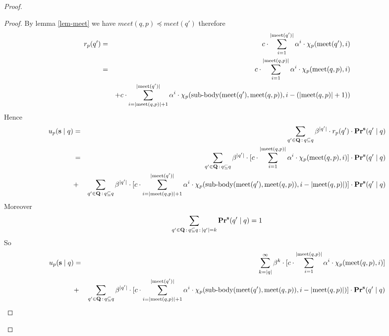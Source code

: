 \begin{proof}
\begin{proof}
	By lemma \ref{lem-meet} we have $meet(q,p) \preceq meet(q')$ therefore
	\begin{eqnarray*}
		r_p(q') & = &{\displaystyle c \cdot \sum_{i=1}^{|\text{\rm meet}(q')|} \alpha^i \cdot \chi_p(\text{\rm meet}(q'),i)} \\
		& = & {\displaystyle c \cdot \sum_{i=1}^{|\text{\rm meet}(q,p)|} \alpha^i \cdot \chi_p(\text{\rm meet}(q,p),i) } \\
		&&	+ {\displaystyle c \cdot \sum_{i=|\text{\rm meet}(q,p)|+1}^{|\text{\rm meet}(q')|} \alpha^{i} \cdot \chi_p({\text{\rm sub-body}}(\text{\rm meet}(q'),\text{\rm meet}(q,p)),i-(|\text{\rm meet}(q,p)|+1))  }   \\
	\end{eqnarray*}
Hence 
	\begin{eqnarray*}
		u_p(\mathbf{s} \mid q)& = & \sum_{q' \in \mathbf{Q} \,:\, q \subseteq q} \beta^{|q'|} \cdot  r_p(q') \cdot \mathbf{Pr}^{\mathbf{s}}(q' \mid q) \\ 
		& = & \sum_{q' \in \mathbf{Q} \,:\, q \subseteq q} \beta^{|q'|} \cdot  [{\displaystyle c \cdot \sum_{i=1}^{|\text{\rm meet}(q,p)|} \alpha^i \cdot \chi_p(\text{\rm meet}(q,p),i) }] \cdot \mathbf{Pr}^{\mathbf{s}}(q' \mid q) \\
		&+ & \sum_{q' \in \mathbf{Q} \,:\, q \subseteq q} \beta^{|q'|} \cdot  [{\displaystyle c \cdot \sum_{i=|\text{\rm meet}(q,p)|+1}^{|\text{\rm meet}(q')|} \alpha^{i} \cdot \chi_p({\text{\rm sub-body}}(\text{\rm meet}(q'),\text{\rm meet}(q,p)),i-|\text{\rm meet}(q,p)|)  }] \cdot \mathbf{Pr}^{\mathbf{s}}(q' \mid q) \\
	\end{eqnarray*}
Moreover $$ \sum_{q' \in \mathbf{Q} \,:\, q \subseteq q \,:\, |q'| =k}  \mathbf{Pr}^{\mathbf{s}}(q' \mid q) = 1$$
So 
	\begin{eqnarray*}
		u_p(\mathbf{s} \mid q) & = & \sum_{k = |q|}^{\infty} \beta^{k} \cdot  [{\displaystyle c \cdot \sum_{i=1}^{|\text{\rm meet}(q,p)|} \alpha^i \cdot \chi_p(\text{\rm meet}(q,p),i) }] \\
		&+ & \sum_{q' \in \mathbf{Q} \,:\, q \subseteq q} \beta^{|q'|} \cdot  [{\displaystyle c \cdot \sum_{i=|\text{\rm meet}(q,p)|+1}^{|\text{\rm meet}(q')|} \alpha^{i} \cdot \chi_p({\text{\rm sub-body}}(\text{\rm meet}(q'),\text{\rm meet}(q,p)),i-|\text{\rm meet}(q,p)|)  }] \cdot \mathbf{Pr}^{\mathbf{s}}(q' \mid q) \\
	\end{eqnarray*}


\end{proof}
\end{proof}
